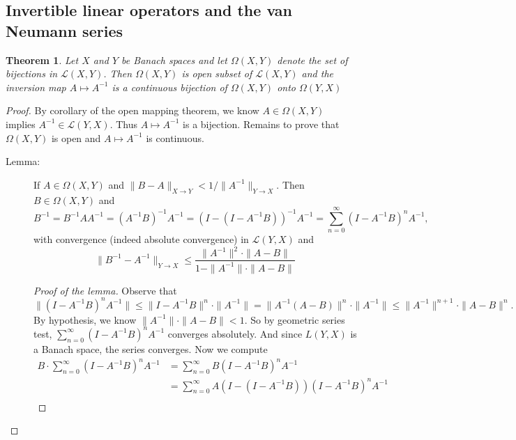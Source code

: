 \documentclass[12pt]{article}
\theoremstyle{plain}
\newtheorem{thm}{Theorem}
\theoremstyle{definition}
\begin{document}
\subsection*{Invertible linear operators and the van Neumann series}
\begin{thm}
    Let $X$ and $Y$ be Banach spaces and let $\Omega(X,Y)$ denote the set of
    bijections in $\mathcal{L}(X,Y)$.
    Then $\Omega(X,Y)$ is open subset of $\mathcal{L}(X,Y)$ and the inversion map
    $A\mapsto A^{-1}$ is a continuous bijection of $\Omega(X,Y)$ onto
    $\Omega(Y,X)$
\end{thm}
\begin{proof}
    By corollary of the open mapping theorem, we know $A\in\Omega(X,Y)$ implies
    $A^{-1}\in \mathcal{L}(Y,X)$.
    Thus $A\mapsto A^{-1}$ is a bijection.
    Remains to prove that $\Omega(X,Y)$ is open and $A\mapsto A^{-1}$ is
    continuous.
    \begin{description}
        \item[Lemma: ]
            If $A\in\Omega(X,Y)$ and $\|B-A\|_{X\rightarrow
            Y}<1/\|A^{-1}\|_{Y\rightarrow X}$.
            Then $B\in\Omega(X,Y)$ and 
            \[
                B^{-1} =  B^{-1}AA^{-1} = 
                (A^{-1}B)^{-1}A^{-1}=(I-(I-A^{-1}B))^{-1}A^{-1} = \sum_{n=0}^\infty(I-A^{-1}B)^n A^{-1},
            \]
            with convergence (indeed absolute convergence) in $\mathcal{L}(Y,X)$ and
            \[
                \|B^{-1}-A^{-1}\|_{Y\rightarrow X}\leq\frac{\|A^{-1}\|^2\cdot\|A-B\|}{1-\|A^{-1}\|\cdot\|A-B\|}
            \]
            \begin{proof}[Proof of the lemma]
                Observe that 
                \[
                    \|(I-A^{-1}B)^nA^{-1}\|\leq
                    \|I-A^{-1}B\|^n\cdot \|A^{-1}\|
                    =\|A^{-1}(A-B)\|^n\cdot\|A^{-1}\|
                    \leq \|A^{-1}\|^{n+1}\cdot\|A-B\|^n.
                \]
                By hypothesis, we know $\|A^{-1}\|\cdot\|A-B\|<1$.
                So by geometric series test, $\sum_{n=0}^\infty (I-A^{-1}B)^nA^{-1}$ converges absolutely.
                And since $L(Y,X)$ is a Banach space, the series converges.
                Now we compute 
                \[\begin{aligned}
                    B\cdot\sum_{n=0}^\infty (I-A^{-1}B)^nA^{-1}
                    &= \sum_{n=0}^\infty B(I-A^{-1}B)^nA^{-1}\\
                    &= \sum_{n=0}^\infty A(I-(I-A^{-1}B))(I-A^{-1}B)^nA^{-1}\\

\end{aligned}\]
\end{proof}
\end{description}
\end{proof}
\end{document}
